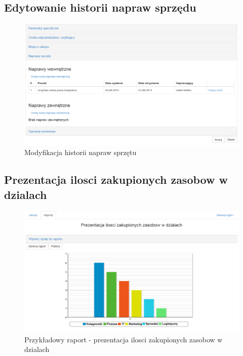 \subsection{Edytowanie historii napraw sprzędu}
\begin{figure}[h!]
	\centering
	\includegraphics[scale=0.4]{img/screens/naprawyWew.png}
	\caption{Modyfikacja historii napraw sprzętu}
\end{figure}

\subsection{Prezentacja ilosci zakupionych zasobow w dzialach}
\begin{figure}[h!]
	\centering
	\includegraphics[scale=0.4]{img/screens/raport.png}
	\caption{Przykładowy raport - prezentacja ilosci zakupionych zasobow w dzialach}
\end{figure}
